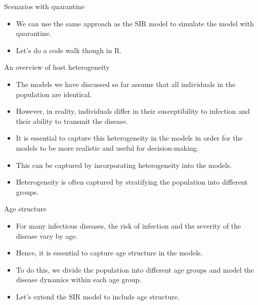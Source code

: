 \documentclass[
  ignorenonframetext,
]{beamer}
\begin{document}
\begin{frame}
\begin{block}{Scenarios with quarantine}
\label{scenarios-with-quarantine}
\begin{itemize}
\item
  We can use the same approach as the SIR model to simulate the model
  with quarantine.
\item
  Let's do a code walk though in R.
\end{itemize}
\end{block}
\end{frame}

\begin{frame}{An overview of host heterogeneity}
\label{an-overview-of-host-heterogeneity}
\begin{itemize}
\item
  The models we have discussed so far assume that all individuals in the
  population are identical.
\item
  However, in reality, individuals differ in their susceptibility to
  infection and their ability to transmit the disease.
\item
  It is essential to capture this heterogeneity in the models in order
  for the models to be more realistic and useful for decision-making.
\end{itemize}
\end{frame}

\begin{frame}
\begin{itemize}
\item
  This can be captured by incorporating heterogeneity into the models.
\item
  Heterogeneity is often captured by stratifying the population into
  different groups.
\end{itemize}
\end{frame}

\begin{frame}
\begin{block}{Age structure}
\label{age-structure}
\begin{itemize}
\item
  For many infectious diseases, the risk of infection and the severity
  of the disease vary by age.
\item
  Hence, it is essential to capture age structure in the models.
\item
  To do this, we divide the population into different age groups and
  model the disease dynamics within each age group.
\item
  Let's extend the SIR model to include age structure.
\end{itemize}
\end{block}
\end{frame}
\end{document}

